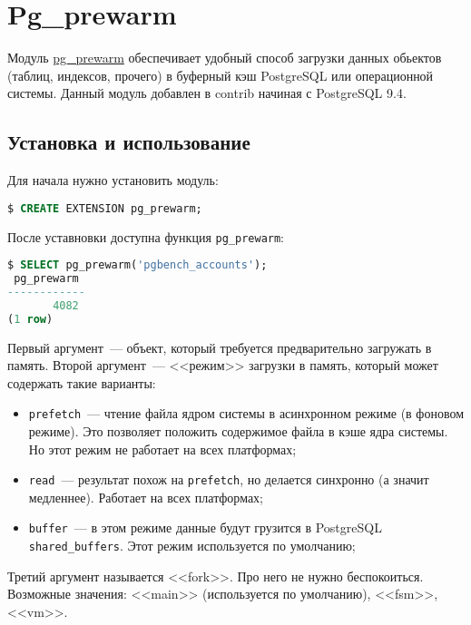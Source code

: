 \section{Pg\_prewarm}

Модуль \href{https://www.postgresql.org/docs/current/static/pgprewarm.html}{pg\_prewarm} обеспечивает удобный способ загрузки данных обьектов (таблиц, индексов, прочего) в буферный кэш PostgreSQL или операционной системы. Данный модуль добавлен в contrib начиная с PostgreSQL 9.4.


\subsection{Установка и использование}

Для начала нужно установить модуль:

\begin{lstlisting}[language=SQL,label=lst:pgprewarm1]
$ CREATE EXTENSION pg_prewarm;
\end{lstlisting}

После уставновки доступна функция \lstinline!pg_prewarm!:

\begin{lstlisting}[language=SQL,label=lst:pgprewarm2]
$ SELECT pg_prewarm('pgbench_accounts');
 pg_prewarm
------------
       4082
(1 row)
\end{lstlisting}

Первый аргумент~--- объект, который требуется предварительно загружать в память. Второй аргумент~--- <<режим>> загрузки в память, который может содержать такие варианты:

\begin{itemize}
  \item \lstinline!prefetch!~--- чтение файла ядром системы в асинхронном режиме (в фоновом режиме). Это позволяет положить содержимое файла в кэше ядра системы. Но этот режим не работает на всех платформах;
  \item \lstinline!read!~--- результат похож на \lstinline!prefetch!, но делается синхронно (а значит медленнее). Работает на всех платформах;
  \item \lstinline!buffer!~--- в этом режиме данные будут грузится в PostgreSQL \lstinline!shared_buffers!. Этот режим используется по умолчанию;
\end{itemize}

Третий аргумент называется <<fork>>. Про него не нужно беспокоиться. Возможные значения: <<main>> (используется по умолчанию), <<fsm>>, <<vm>>.

